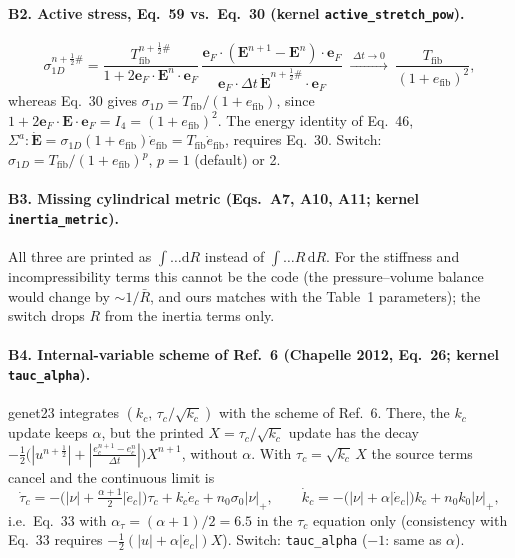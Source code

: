 \documentclass[10pt]{article}
\begin{document}
\paragraph{B2. Active stress, Eq.~59 vs.\ Eq.~30 (kernel \texttt{active\_stretch\_pow}).}
\begin{equation*}
\sigma_{1D}^{n+\frac12\#}=\frac{T_\text{fib}^{n+\frac12\#}}{1+2\boldsymbol e_F\!\cdot\!\boldsymbol E^n\!\cdot\!\boldsymbol e_F}\,
\frac{\boldsymbol e_F\cdot(\boldsymbol E^{n+1}-\boldsymbol E^n)\cdot\boldsymbol e_F}{\boldsymbol e_F\cdot\Delta t\,\dot{\boldsymbol E}^{n+\frac12\#}\cdot\boldsymbol e_F}
\;\xrightarrow{\;\Delta t\to0\;}\;\frac{T_\text{fib}}{(1+e_\text{fib})^2},
\end{equation*}
whereas Eq.~30 gives $\sigma_{1D}=T_\text{fib}/(1+e_\text{fib})$,
since $1+2\boldsymbol e_F\cdot\boldsymbol E\cdot\boldsymbol e_F=I_4=(1+e_\text{fib})^2$. The energy
identity of Eq.~46,
$\Sigma^a:\dot{\boldsymbol E}=\sigma_{1D}(1+e_\text{fib})\dot e_\text{fib}=T_\text{fib}\dot e_\text{fib}$,
requires Eq.~30. Switch: $\sigma_{1D}=T_\text{fib}/(1+e_\text{fib})^p$, $p=1$ (default) or 2.

\paragraph{B3. Missing cylindrical metric (Eqs.~A7, A10, A11; kernel \texttt{inertia\_metric}).}
All three are printed as $\int\ldots\mathrm dR$ instead of $\int\ldots R\,\mathrm dR$. For the
stiffness and incompressibility terms this cannot be the code (the pressure--volume balance
would change by $\sim1/\bar R$, and ours matches with the Table~1 parameters); the switch drops
$R$ from the inertia terms only.

\paragraph{B4. Internal-variable scheme of Ref.~6 (Chapelle 2012, Eq.~26; kernel \texttt{tauc\_alpha}).}
genet23 integrates $(k_c,\,\tau_c/\sqrt{k_c})$ with the scheme of Ref.~6. There, the $k_c$ update
keeps $\alpha$, but the printed $X=\tau_c/\sqrt{k_c}$ update has the decay
$-\tfrac12\big(|u^{n+\frac12}|+|\tfrac{e_c^{n+1}-e_c^n}{\Delta t}|\big)X^{n+1}$, without $\alpha$.
With $\tau_c=\sqrt{k_c}\,X$ the source terms cancel and the continuous limit is
\begin{equation*}
\dot\tau_c=-\Big(|\nu|+\tfrac{\alpha+1}{2}|\dot e_c|\Big)\tau_c+k_c\dot e_c+n_0\sigma_0|\nu|_+ ,
\qquad
\dot k_c=-\big(|\nu|+\alpha|\dot e_c|\big)k_c+n_0k_0|\nu|_+ ,
\end{equation*}
i.e.\ Eq.~33 with $\alpha_\tau=(\alpha+1)/2=6.5$ in the $\tau_c$ equation only (consistency with
Eq.~33 requires $-\tfrac12(|u|+\alpha|\dot e_c|)X$). Switch: \texttt{tauc\_alpha} ($-1$: same as
$\alpha$).
\end{document}
